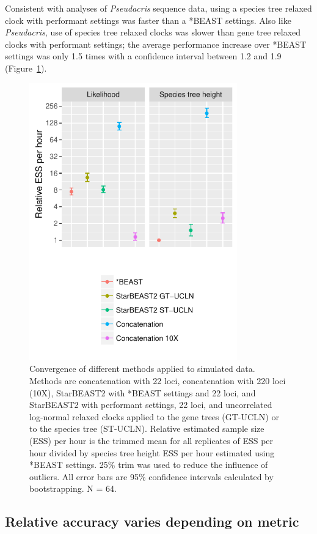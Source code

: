 \documentclass[12pt]{article}
\begin{document}
Consistent with analyses of \textit{Pseudacris} sequence data, using a species
tree relaxed clock with performant settings was faster than a *BEAST settings.
Also like \textit{Pseudacris}, use of species tree relaxed clocks was slower than
gene tree relaxed clocks with performant settings; the average performance
increase over *BEAST settings was only 1.5 times with a confidence interval
between 1.2 and 1.9 (Figure~\ref{fig:simulatedEssPerHour}).

\begin{figure}[htb!]
\centering
\includegraphics[width=9cm]{multiple_ess_per_hour.pdf}
\caption
{Convergence of different methods applied to simulated data. Methods are
concatenation with 22 loci, concatenation with 220 loci (10X), StarBEAST2 with
*BEAST settings and 22 loci, and StarBEAST2 with performant settings, 22 loci,
and uncorrelated log-normal relaxed clocks applied to the gene trees (GT-UCLN) or
to the species tree (ST-UCLN). Relative estimated sample size (ESS) per hour is the trimmed mean for all replicates of
ESS per hour divided by species tree height ESS per hour estimated using *BEAST
settings. 25\% trim was used to reduce the influence of
outliers. All error bars are 95\% confidence intervals calculated by
bootstrapping. N = 64.}
\label{fig:simulatedEssPerHour}
\end{figure}

\subsection*{Relative accuracy varies depending on metric}
\end{document}
